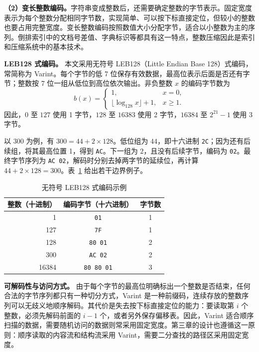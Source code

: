 \textbf{（2）变长整数编码。}字符串变成整数后，还需要确定整数的字节表示。固定宽度表示为每个整数分配相同字节数，实现简单、可以按下标直接定位，但较小的整数也要占用完整宽度。变长整数编码按照数值大小分配字节，适合以小整数为主的序列。倒排索引中的文档号差值、字典标识等都具有这一特点，整数压缩因此是索引和压缩系统中的基本技术\cite{williams1999compressing}。

\textbf{LEB128 式编码。} 本文采用无符号 LEB128（Little Endian Base 128）式编码，常简称为 Varint。每个字节的低 7 位保存有效数据，最高位表示后面是否还有字节；整数按 7 位一组从低位到高位依次输出。非负整数 $x$ 的编码字节数为
\[
b(x)=\begin{cases}
1, & x=0,\\
\lfloor\log_{128}x\rfloor+1, & x\geq 1.
\end{cases}
\]
因此，$0$ 至 $127$ 使用 1 字节，$128$ 至 $16383$ 使用 2 字节，$16384$ 至 $2^{21}-1$ 使用 3 字节。

以 $300$ 为例，有 $300=44+2\times128$。低位组为 $44$，即十六进制 \texttt{2C}；因为还有后续组，将其最高位置 1，得到 \texttt{AC}。下一组为 $2$，且没有后续字节，编码为 \texttt{02}。最终字节序列为 \texttt{AC 02}，解码时分别去掉两字节的延续位，再计算 $44+2\times128=300$。表~\ref{tab:foundation-varint} 给出若干边界例子。

\begin{table}[htbp]
\centering
\caption{无符号 LEB128 式编码示例}
\label{tab:foundation-varint}
\begin{tabular}{rcc}
\toprule
整数（十进制） & 编码字节（十六进制） & 字节数 \\
\midrule
1 & \texttt{01} & 1 \\
127 & \texttt{7F} & 1 \\
128 & \texttt{80 01} & 2 \\
300 & \texttt{AC 02} & 2 \\
16384 & \texttt{80 80 01} & 3 \\
\bottomrule
\end{tabular}
\end{table}

\textbf{可解码性与访问方式。} 由于每个字节的最高位明确标出一个整数是否结束，任何合法的字节序列都只有一种切分方式，Varint 是一种前缀码，连续存放的整数序列可以无歧义地顺序解码。其代价是失去按下标直接定位的能力：要读取第 $i$ 个整数，必须先解码前面的 $i-1$ 个，或者另外保存偏移表。因此，Varint 适合顺序扫描的数据，需要随机访问的数据则常采用固定宽度。第三章的设计也遵循这一原则：顺序读取的内容流和结构流采用 Varint，需要二分查找的路径区采用固定宽度。

